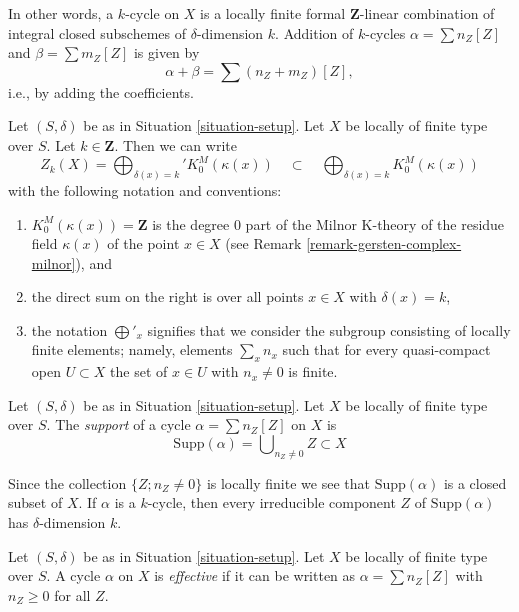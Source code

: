 \noindent
In other words, a $k$-cycle on $X$
is a locally finite formal $\mathbf{Z}$-linear
combination of integral closed subschemes of $\delta$-dimension $k$.
Addition of $k$-cycles $\alpha = \sum n_Z[Z]$ and
$\beta = \sum m_Z[Z]$ is given by
$$
\alpha + \beta = \sum (n_Z + m_Z)[Z],
$$
i.e., by adding the coefficients.

\begin{remark}
\label{remark-cycles-pointwise}
Let $(S, \delta)$ be as in Situation \ref{situation-setup}.
Let $X$ be locally of finite type over $S$. Let $k \in \mathbf{Z}$.
Then we can write
$$
Z_k(X) = \bigoplus\nolimits_{\delta(x) = k}' K_0^M(\kappa(x))
\quad\subset\quad
\bigoplus\nolimits_{\delta(x) = k} K_0^M(\kappa(x))
$$
with the following notation and conventions:
\begin{enumerate}
\item $K_0^M(\kappa(x)) = \mathbf{Z}$ is the degree $0$ part of
the Milnor K-theory of the residue field $\kappa(x)$ of the point
$x \in X$ (see Remark \ref{remark-gersten-complex-milnor}), and
\item the direct sum on the right is over all points $x \in X$
with $\delta(x) = k$,
\item the notation $\bigoplus'_x$ signifies that we consider the
subgroup consisting of locally finite elements; namely, elements
$\sum_x n_x$ such that for every quasi-compact open $U \subset X$
the set of $x \in U$ with $n_x \not = 0$ is finite.
\end{enumerate}
\end{remark}

\begin{definition}
\label{definition-support-cycle}
Let $(S, \delta)$ be as in Situation \ref{situation-setup}.
Let $X$ be locally of finite type over $S$.
The {\it support} of a cycle $\alpha = \sum n_Z [Z]$ on $X$
is
$$
\text{Supp}(\alpha) = \bigcup\nolimits_{n_Z \not = 0} Z \subset X
$$
\end{definition}

\noindent
Since the collection $\{Z; n_Z \not = 0\}$ is locally finite
we see that $\text{Supp}(\alpha)$ is a closed subset of $X$.
If $\alpha$ is a $k$-cycle, then every irreducible component $Z$
of $\text{Supp}(\alpha)$ has $\delta$-dimension $k$.

\begin{definition}
\label{definition-effective-cycle}
Let $(S, \delta)$ be as in Situation \ref{situation-setup}.
Let $X$ be locally of finite type over $S$.
A cycle $\alpha$ on $X$ is {\it effective} if it
can be written as $\alpha =\sum n_Z [Z]$ with $n_Z \geq 0$ for all $Z$.
\end{definition}

